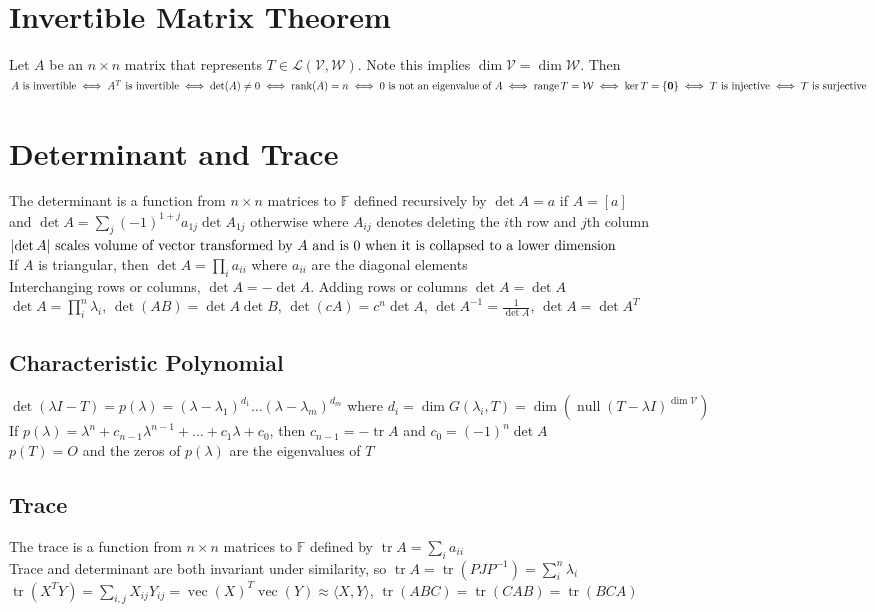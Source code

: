 \documentclass{article}
\DeclarePairedDelimiter\abs{\lvert}{\rvert}%
\DeclareMathOperator{\rank}{rank}
\DeclareMathOperator{\range}{range}
\DeclareMathOperator{\nullspace}{null}
\DeclareMathOperator{\tr}{tr}
\DeclareMathOperator{\vect}{vec}
\newcommand{\F}{\mathbb{F}}
\newcommand{\linear}{\mathcal{L}}
\newcommand{\V}{\mathcal{V}}
\newcommand{\W}{\mathcal{W}}
\newcommand\inner[2]{\langle #1, #2 \rangle}
\begin{document}
\section{Invertible Matrix Theorem}
Let $A$ be an $n \times n$ matrix that represents $T \in \linear(\V, \W)$. Note this implies $\dim \V = \dim \W$. Then \\
$A \mbox{ is invertible} \iff A^T \mbox{ is invertible} \iff \det(A) \neq 0 \iff \rank(A) = n \iff 0 \mbox{ is not an eigenvalue of } A \\ \iff \range T = \W \iff \ker T = \{ \boldsymbol{0} \} \iff T \mbox{ is injective} \iff T \mbox{ is surjective}$

\section{Determinant and Trace}
The determinant is a function from $n \times n$ matrices to $\F$ defined recursively by $\det A = a$ if $A = [a]$ \\ 
and $\det A = \sum_j (-1)^{1+j}a_{1j} \det A_{1j}$ otherwise where $A_{ij}$ denotes deleting the $i$th row and $j$th column \\
$\abs {\det A} \mbox{ scales volume of vector transformed by $A$ and is 0 when it is collapsed to a lower dimension}$ \\
If $A$ is triangular, then $\det A = \prod_i a_{ii}$ where $a_{ii}$ are the diagonal elements \\
Interchanging rows or columns, $\det A = - \det A$. Adding rows or columns $\det A = \det A$ \\
$\det A = \prod_i^n \lambda_i $, $\det (AB) = \det A \det B$, $\det (cA) = c^n \det A$, $\det A^{-1} = \frac{1}{\det A}$, $\det A = \det A^T$


\subsection{Characteristic Polynomial}
$\det(\lambda I - T) = p(\lambda) = (\lambda-\lambda_1)^{d_1} \ldots (\lambda-\lambda_m)^{d_m}$ where $d_i = \dim G(\lambda_i, T) = \dim (\nullspace (T- \lambda I)^{\dim \V})$ \\
If $p(\lambda) = \lambda^n + c_{n-1}\lambda^{n-1} + \ldots + c_1\lambda + c_0$, then $c_{n-1} = -\tr A$ and $c_0 = (-1)^n \det A$ \\
$p(T) = O$ and the zeros of $p(\lambda)$ are the eigenvalues of $T$
\subsection{Trace}
The trace is a function from $n \times n$ matrices to $\F$ defined by $\tr A = \sum_i a_{ii}$ \\
Trace and determinant are both invariant under similarity, so $\tr A =  \tr (PJP^{-1}) = \sum_i^n \lambda_i $ \\
$\tr (X^TY) = \sum_{i, j} X_{ij}Y_{ij} = \vect (X)^T \vect(Y) \approx \inner{X}{Y}$, $\tr (ABC) = \tr(CAB) = \tr(BCA)$ 
\end{document}
